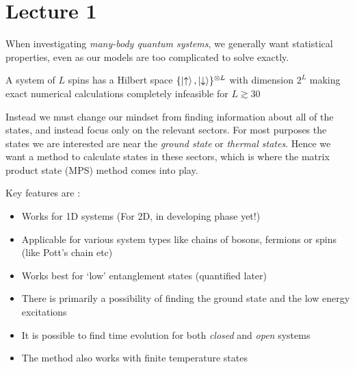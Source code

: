 \documentclass[a4paper]{article}
\author{Oscar Emil Sommer \\
A. Anand}
\begin{document}
\section{Lecture 1}
When investigating \emph{many-body quantum systems}, we generally want statistical properties,
even as our models are too complicated to solve exactly.

\begin{example}
    A system of $L$ spins has a Hilbert space
    $\{\ket{\uparrow},\ket{\downarrow}\}^{\otimes L} $ 
    with  dimension $2^L$ making exact
    numerical calculations completely infeasible for $L\gtrsim 30$
    \begin{center}
    \end{center}
    
\end{example}
Instead we must change our mindset from finding information about all of the
states, and instead focus only on the relevant sectors. For most purposes the
states we are interested are near the \emph{ground state} or \emph{thermal
states}.  Hence we want a method to calculate states in these sectors, which is
where the matrix product state (MPS) method comes into play.\\
\begin{remark} Key features are :
    \mbox{}
\begin{itemize}
    \item Works for 1D systems (For 2D, in developing phase yet!)
    \item Applicable for various system types like chains of bosons, fermions or spins (like Pott's chain etc)
    \item Works best for `low' entanglement states (quantified later)
    \item There is primarily a possibility of finding the ground state and the low energy excitations
    \item It is possible to find time evolution for both \emph{closed} and \emph{open} systems
    \item The method also works with finite temperature states
\end{itemize}
\end{remark}
\end{document}
